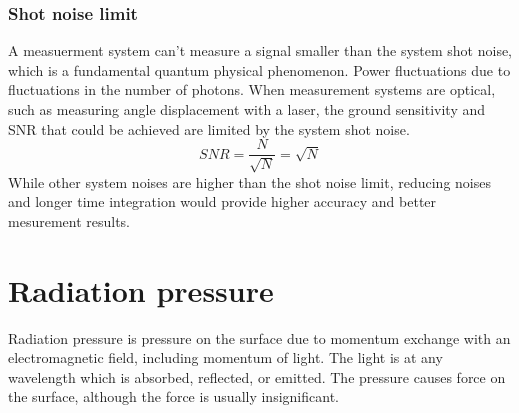 \documentclass[\main/master.tex]{subfiles}
\begin{document}
\subsubsection{Shot noise limit}
A measuerment system can't measure a signal smaller than the system shot noise, which is a fundamental quantum physical phenomenon. Power fluctuations due to fluctuations in the number of photons. When measurement systems are optical, such as measuring angle displacement with a laser, the ground sensitivity and SNR that could be achieved are limited by the system shot noise.   
\begin{equation}
SNR = \frac{N}{\sqrt{N}} = \sqrt{N}    \label{eqn:shot_noise}
\end{equation}
While other system noises are higher than the shot noise limit, reducing noises and longer time integration would provide higher accuracy and better mesurement results. 

\section{Radiation pressure}
Radiation pressure is pressure on the surface due to momentum exchange with an electromagnetic field, including momentum of light. The light is at any wavelength which is absorbed, reflected, or emitted. The pressure causes force on the surface, although the force is usually insignificant.
  
\end{document}
